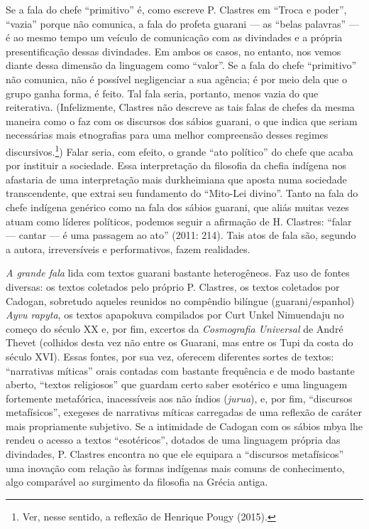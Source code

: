Se a fala do chefe ``primitivo'' é, como escreve P. Clastres em ``Troca
e poder'', ``vazia'' porque não comunica, a fala do profeta guarani ---
as ``belas palavras'' --- é ao mesmo tempo um veículo de comunicação com
as divindades e a própria presentificação dessas divindades. Em ambos os
casos, no entanto, nos vemos diante dessa dimensão da linguagem como
``valor''. Se a fala do chefe ``primitivo'' não comunica, não é possível
negligenciar a sua agência; é por meio dela que o grupo ganha forma, é
feito. Tal fala seria, portanto, menos vazia do que reiterativa.
(Infelizmente, Clastres não descreve as tais falas de chefes da mesma
maneira como o faz com os discursos dos sábios guarani, o que indica que
seriam necessárias mais etnografias para uma melhor compreensão desses
regimes discursivos.\footnote{Ver, nesse sentido, a reflexão de Henrique
  Pougy (2015).}) Falar seria, com efeito, o grande ``ato político'' do
chefe que acaba por instituir a sociedade. Essa interpretação da
filosofia da chefia indígena nos afastaria de uma interpretação mais
durkheimiana que aposta numa sociedade transcendente, que extrai seu
fundamento do ``Mito-Lei divino''. Tanto na fala do chefe indígena
genérico como na fala dos sábios guarani, que aliás muitas vezes atuam
como líderes políticos, podemos seguir a afirmação de H. Clastres:
``falar --- cantar --- é uma passagem ao ato'' (2011: 214). Tais atos de
fala são, segundo a autora, irreversíveis e performativos, fazem
realidades.

\emph{A grande fala} lida com textos guarani bastante heterogêneos. Faz
uso de fontes diversas: os textos coletados pelo próprio P. Clastres, os
textos coletados por Cadogan, sobretudo aqueles reunidos no compêndio
bilíngue (guarani/espanhol) \emph{Ayvu rapyta}, os textos apapokuva
compilados por Curt Unkel Nimuendaju no começo do século XX e, por fim,
excertos da \emph{Cosmografia Universal} de André Thevet (colhidos desta
vez não entre os Guarani, mas entre os Tupi da costa do século XVI).
Essas fontes, por sua vez, oferecem diferentes sortes de textos:
``narrativas míticas'' orais contadas com bastante frequência e de modo
bastante aberto, ``textos religiosos'' que guardam certo saber esotérico
e uma linguagem fortemente metafórica, inacessíveis aos não índios
(\emph{jurua}), e, por fim, ``discursos metafísicos'', exegeses de
narrativas míticas carregadas de uma reflexão de caráter mais
propriamente subjetivo. Se a intimidade de Cadogan com os sábios mbya
lhe rendeu o acesso a textos ``esotéricos'', dotados de uma linguagem
própria das divindades, P. Clastres encontra no que ele equipara a
``discursos metafísicos'' uma inovação com relação às formas indígenas
mais comuns de conhecimento, algo comparável ao surgimento da filosofia
na Grécia antiga.


